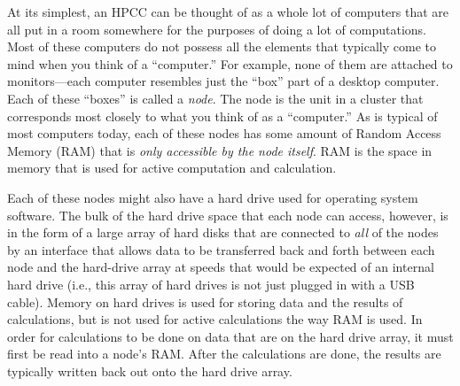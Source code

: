 \documentclass[]{krantz}
\begin{document}
At its simplest, an HPCC can be thought of as a whole lot of computers that are all
put in a room somewhere for the purposes of doing a lot of computations. Most of these
computers do not possess all the elements that typically come to mind when you
think of a ``computer.'' For example, none of them are attached to monitors---each
computer resembles just the ``box'' part of a desktop computer. Each of these ``boxes'' is called
a \emph{node}. The node is the unit in a cluster that corresponds most closely to what you think of
as a ``computer.'' As is typical of most computers today, each of these nodes has some
amount of Random Access Memory (RAM) that is \emph{only accessible by the node itself}. RAM
is the space in memory that is used for active computation and calculation.

Each of these
nodes might also have a hard drive used for operating system software. The bulk of the
hard drive space that each node can access, however, is in the form of a large array of hard disks
that are connected to \emph{all} of the nodes by an interface that allows data to be transferred
back and forth between each node and the hard-drive array at speeds that would be expected of
an internal hard drive (i.e., this array of hard drives is not just plugged in with a USB
cable). Memory on hard drives is used for storing data and the results of calculations, but
is not used for active calculations the way RAM is used. In order for calculations to be done
on data that are on the hard drive array, it must first be read into a node's RAM. After the calculations
are done, the results are typically written back out onto the hard drive array.
\end{document}

